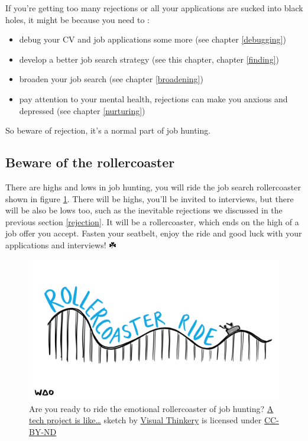 \documentclass[
]{book}
\providecommand{\tightlist}{%
  \setlength{\itemsep}{0pt}\setlength{\parskip}{0pt}}
\begin{document}
If you're getting too many rejections or all your applications are sucked into black holes, it might be because you need to :

\begin{itemize}
\tightlist
\item
  debug your CV and job applications some more (see chapter \ref{debugging})
\item
  develop a better job search strategy (see this chapter, chapter \ref{finding})
\item
  broaden your job search (see chapter \ref{broadening})
\item
  pay attention to your mental health, rejections can make you anxious and depressed (see chapter \ref{nurturing})
\end{itemize}

So beware of rejection, it's a normal part of job hunting.

\hypertarget{rollercoaster}{%
\subsection{Beware of the rollercoaster}\label{rollercoaster}}

There are highs and lows in job hunting, you will ride the job search rollercoaster shown in figure \ref{fig:rollercoaster-fig}. There will be highs, you'll be invited to interviews, but there will be also be lows too, such as the inevitable rejections we discussed in the previous section \ref{rejection}. It will be a rollercoaster, which ends on the high of a job offer you accept. Fasten your seatbelt, enjoy the ride and good luck with your applications and interviews! ☘️

\begin{figure}

{\centering \includegraphics[width=0.98\linewidth]{images/Rollercoaster-ride} 

}

\caption{Are you ready to ride the emotional rollercoaster of job hunting? \href{https://bryanmmathers.com/rollercoaster-ride}{A tech project is like\ldots{}} sketch by \href{https://visualthinkery.com/}{Visual Thinkery} is licensed under \href{https://creativecommons.org/licenses/by-nd/4.0/}{CC-BY-ND}}\label{fig:rollercoaster-fig}
\end{figure}
\end{document}
